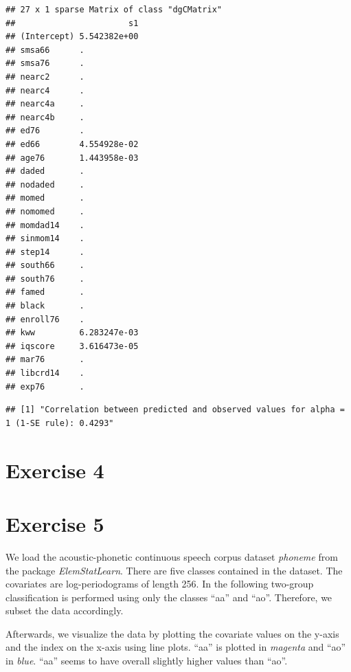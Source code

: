 \documentclass[
]{article}
\begin{document}
\begin{verbatim}
## 27 x 1 sparse Matrix of class "dgCMatrix"
##                       s1
## (Intercept) 5.542382e+00
## smsa66      .           
## smsa76      .           
## nearc2      .           
## nearc4      .           
## nearc4a     .           
## nearc4b     .           
## ed76        .           
## ed66        4.554928e-02
## age76       1.443958e-03
## daded       .           
## nodaded     .           
## momed       .           
## nomomed     .           
## momdad14    .           
## sinmom14    .           
## step14      .           
## south66     .           
## south76     .           
## famed       .           
## black       .           
## enroll76    .           
## kww         6.283247e-03
## iqscore     3.616473e-05
## mar76       .           
## libcrd14    .           
## exp76       .
\end{verbatim}

\begin{verbatim}
## [1] "Correlation between predicted and observed values for alpha = 1 (1-SE rule): 0.4293"
\end{verbatim}

\hypertarget{exercise-4}{%
\section{Exercise 4}\label{exercise-4}}

\hypertarget{exercise-5}{%
\section{Exercise 5}\label{exercise-5}}

We load the acoustic-phonetic continuous speech corpus dataset
\textit{phoneme} from the package \textit{ElemStatLearn}. There are five
classes contained in the dataset. The covariates are log-periodograms of
length 256. In the following two-group classification is performed using
only the classes ``aa'' and ``ao''. Therefore, we subset the data
accordingly.

Afterwards, we visualize the data by plotting the covariate values on
the y-axis and the index on the x-axis using line plots. ``aa'' is
plotted in \textit{magenta} and ``ao'' in \textit{blue}. ``aa'' seems to
have overall slightly higher values than ``ao''.
\end{document}
